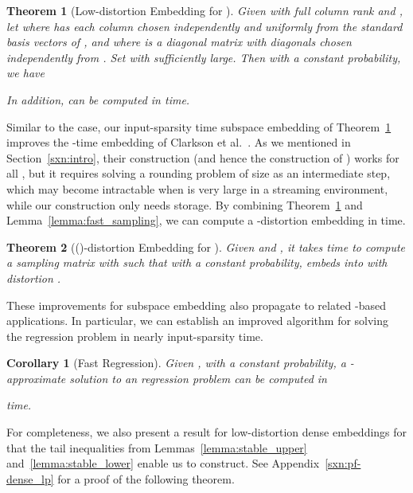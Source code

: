 \documentclass[11pt]{article}
\newtheorem{theorem}{Theorem}
\newtheorem{corollary}{Corollary}
\begin{document}
\begin{theorem}[Low-distortion Embedding for ]
  \label{thm:sparse_lp}
  Given  with full column rank and , let  where  has each column
  chosen independently and uniformly from the  standard basis vectors of
  , and where  is a diagonal matrix with diagonals
  chosen independently from .
  Set  with  sufficiently large.
  Then with a constant probability, we have
  
  In addition,  can be computed in  time.
\end{theorem}


\noindent
Similar to the  case, our input-sparsity time  subspace
embedding of Theorem~\ref{thm:sparse_lp} improves the -time
embedding of Clarkson et al.~\cite{CDMMMW13_SODA}.
As we mentioned in Section~\ref{sxn:intro}, their construction (and hence the
construction of \cite{CW12sparse_TR}) works for all , but it
requires solving a rounding problem of size  as an
intermediate step, which may become intractable when  is very large in a
streaming environment, while our construction only needs 
storage.
By combining Theorem~\ref{thm:sparse_lp} and
Lemma~\ref{lemma:fast_sampling}, we can compute a -distortion
embedding in  time.

\begin{theorem}[()-distortion Embedding for ]
  \label{thm:sparse_lp-eps}
  Given  and , it takes  time to compute a sampling matrix  with
   such that with a constant
  probability,  embeds  into  with distortion .
\end{theorem}

\noindent
These improvements for  subspace embedding also propagate to related
-based applications.
In particular, we can establish an improved algorithm for solving the 
regression problem in nearly input-sparsity time.



\begin{corollary}[Fast  Regression]
  Given , with a constant probability, a
  -approximate solution to an  regression problem can be
  computed in
  
  time.
\end{corollary}





For completeness, we also present a result for low-distortion dense 
embeddings for  that the tail inequalities from 
Lemmas~\ref{lemma:stable_upper} and~\ref{lemma:stable_lower} enable us to 
construct.
See Appendix~\ref{sxn:pf-dense_lp} for a proof of the following theorem.
\end{document}

